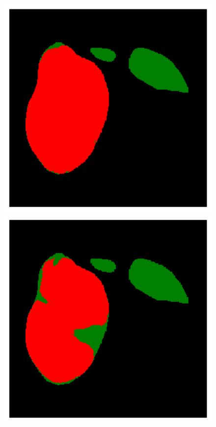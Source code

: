 {\begin{figure}[!ht]
\begin{mdframed}[backgroundcolor=blue!50,linecolor=blue!50]
\begin{minipage}{4cm}
	\end{minipage} \hspace{-0.3cm}
	\begin{minipage}{4cm}
		\includegraphics[width=\linewidth]{images/TumorMult_GT_Pat5_0}
	\end{minipage} \hspace{-0.3cm}
	\begin{minipage}{4cm}
		\includegraphics[width=\linewidth]{images/TumorMult_Pred_Pat5_0}

\end{minipage}
\end{mdframed}
\end{figure}}
